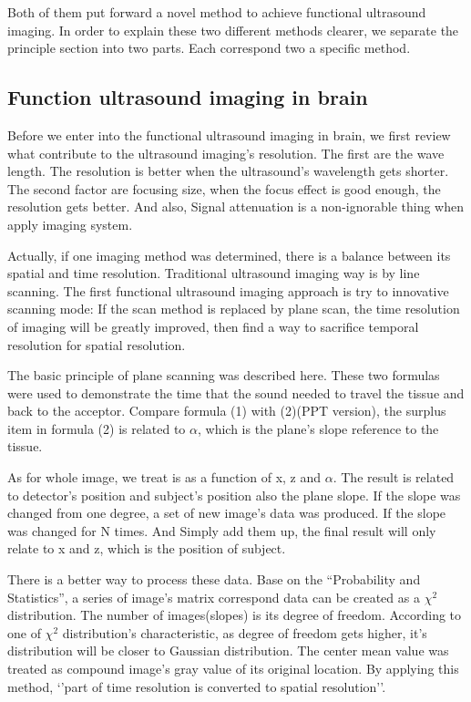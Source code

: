 \documentclass[paper=a4, fontsize=11pt]{scrartcl} %
\numberwithin{equation}{section} %
\numberwithin{figure}{section} %
\numberwithin{table}{section} %
\begin{document}
Both of them put forward a novel method to achieve functional ultrasound imaging. In order to explain these two different methods clearer, we separate the principle section into two parts. Each correspond two a specific method.
\subsection{Function ultrasound imaging in brain}

Before we enter into the functional ultrasound imaging in brain, we first review what contribute to the ultrasound imaging’s resolution. The first are the wave length. The resolution is better when the ultrasound’s wavelength gets shorter. The second factor are focusing size, when the focus effect is good enough, the resolution gets better. And also, Signal attenuation is a non-ignorable thing when apply imaging system. 

Actually, if one imaging method was determined, there is a balance between its spatial and time resolution. Traditional ultrasound imaging way is by line scanning. The first functional ultrasound imaging approach is try to innovative scanning mode: If the scan method is replaced by plane scan, the time resolution of imaging will be greatly improved, then find a way to sacrifice temporal resolution for spatial resolution.

The basic principle of plane scanning was described here. These two formulas were used to demonstrate the time that the sound needed to travel the tissue and back to the acceptor. Compare formula (1) with (2)(PPT version), the surplus item in formula (2) is related to $\alpha$, which is the plane’s slope reference to the tissue. 

As for whole image, we treat is as a function of x, z and $\alpha$. The result is related to detector’s position and subject’s position also the plane slope. If the slope was changed from one degree, a set of new image’s data was produced. If the slope was changed for N times. And Simply add them up, the final result will only relate to x and z, which is the position of subject.

There is a better way to process these data. Base on the “Probability and Statistics”, a series of image’s matrix correspond data can be created as a $\chi^{2}$ distribution. The number of images(slopes) is its degree of freedom. According to one of $\chi^{2}$ distribution’s characteristic, as degree of freedom gets higher, it’s distribution will be closer to Gaussian distribution. The center mean value was treated as compound image’s gray value of its original location. By applying this method, ‘’part of time resolution is converted to spatial resolution’’.
\end{document}
